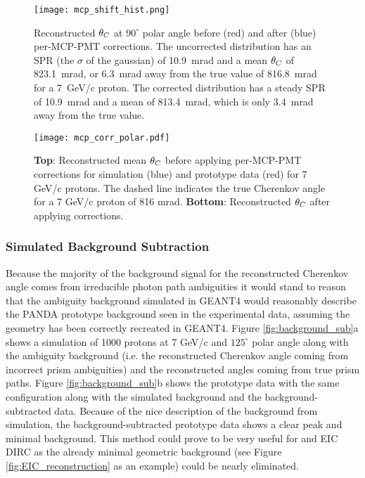 \begin{figure}[!htb]
	\centering
	\texttt{[image: mcp\_shift\_hist.png]}
	\caption{Reconstructed $\theta_{C}$ at $90^\circ$ polar angle before (red) and after (blue) per-MCP-PMT corrections. The uncorrected distribution has an SPR (the $\sigma$ of the gaussian) of 10.9~mrad and a mean $\theta_{C}$ of 823.1~mrad, or 6.3~mrad away from the true value of 816.8~mrad for a 7~GeV/c proton. The corrected distribution has a steady SPR of 10.9~mrad and a mean of 813.4~mrad, which is only 3.4~mrad away from the true value.}
	\label{fig:mcp_corr_hist}
\end{figure}


\begin{figure}[!htb]
	\centering
	\texttt{[image: mcp\_corr\_polar.pdf]}
	\caption{\textbf{Top}: Reconstructed mean $\theta_{C}$ before applying per-MCP-PMT corrections for simulation (blue) and prototype data (red) for 7 GeV/c protons. The dashed line indicates the true Cherenkov angle for a 7 GeV/c proton of 816 mrad. \textbf{Bottom}: Reconstructed $\theta_{C}$ after applying corrections.}
	\label{fig:mcp_corr_polar}
\end{figure}


\subsubsection{Simulated Background Subtraction}
Because the majority of the background signal for the reconstructed Cherenkov angle comes from irreducible photon path ambiguities it would stand to reason that the ambiguity background simulated in GEANT4 would reasonably describe the PANDA prototype background seen in the experimental data, assuming the geometry has been correctly recreated in GEANT4. Figure \ref{fig:background_sub}a shows a simulation of 1000 protons at 7 GeV/c and $125^\circ$ polar angle along with the ambiguity background (i.e. the reconstructed Cherenkov angle coming from incorrect prism ambiguities) and the reconstructed angles coming from true prism paths. Figure \ref{fig:background_sub}b shows the prototype data with the same configuration along with the simulated background and the background-subtracted data. Because of the nice description of the background from simulation, the background-subtracted prototype data shows a clear peak and minimal background. This method could prove to be very useful for and EIC DIRC as the already minimal geometric background (see Figure \ref{fig:EIC_reconstruction} as an example) could be nearly eliminated.

